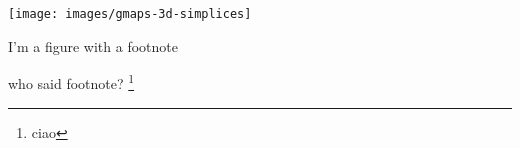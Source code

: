 \chapter{}

\begin{marginfigure}
	\texttt{[image: images/gmaps-3d-simplices]}
	\caption{I'm a figure with a footnote}
\end{marginfigure}

\blindtext

who said footnote? \footnote{ciao \blindtext}
